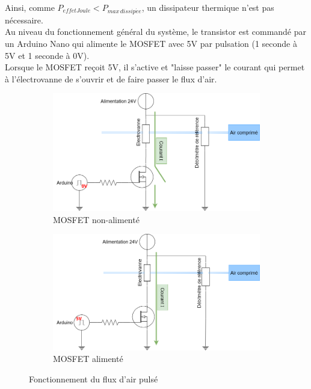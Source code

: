 Ainsi, comme $P_{effetJoule} < P_{max\,dissip\acute{e}e}$, un dissipateur thermique n'est pas nécessaire. \\

Au niveau du fonctionnement général du système, le transistor est commandé par un Arduino Nano qui alimente le MOSFET avec 5V par pulsation (1 seconde à 5V et 1 seconde à 0V). \\
Lorsque le MOSFET reçoit 5V, il s'active et "laisse passer" le courant qui permet à l'électrovanne de s'ouvrir et de faire passer le
flux d'air.
\begin{figure}[H]
    \centering
    \begin{subfigure}[b]{0.45\textwidth}
        \hspace{-1.5cm}
        \includegraphics[scale = 0.3]{assets/figures/MOSFET_0V.png}
        \caption{MOSFET non-alimenté}
        \label{fig:MOSFET_0V}
    \end{subfigure}
    \begin{subfigure}[b]{0.45\textwidth}
        \centering
        \includegraphics[scale = 0.3]{assets/figures/MOSFET_5V.png}
        \caption{MOSFET alimenté}
        \label{fig:MOSFET_5V}
    \end{subfigure}
    \caption{Fonctionnement du flux d'air pulsé}
    \label{fig:flux_pulse}
\end{figure}

